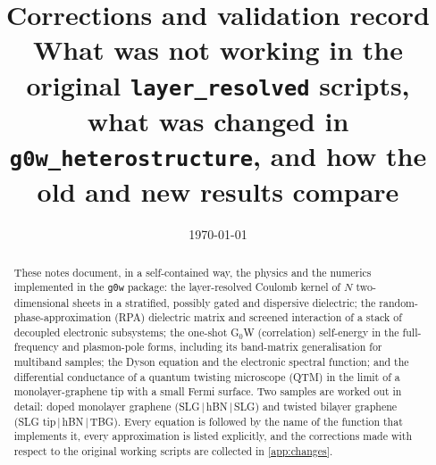 \documentclass[11pt,a4paper]{article}
\title{\textbf{Corrections and validation record}\\[4pt]
\large What was not working in the original \texttt{layer\_resolved} scripts, what was changed in
\texttt{g0w\_heterostructure}, and how the old and new results compare}
\author{}
\date{\today}
\theoremstyle{remark}
\begin{document}
\maketitle

\begin{abstract}
These notes document, in a self-contained way, the physics and the numerics implemented in the
\texttt{g0w} package: the layer-resolved Coulomb kernel of $N$ two-dimensional sheets in a stratified,
possibly gated and dispersive dielectric; the random-phase-approximation (RPA) dielectric matrix and
screened interaction of a stack of decoupled electronic subsystems; the one-shot G$_0$W
(correlation) self-energy in the full-frequency and plasmon-pole forms, including its band-matrix
generalisation for multiband samples; the Dyson equation and the electronic spectral function; and the
differential conductance of a quantum twisting microscope (QTM) in the limit of a monolayer-graphene tip
with a small Fermi surface. Two samples are worked out in detail: doped monolayer graphene
(SLG\,$|$\,hBN\,$|$\,SLG) and twisted bilayer graphene (SLG tip\,$|$\,hBN\,$|$\,TBG). Every equation is
followed by the name of the function that implements it, every approximation is listed explicitly, and
the corrections made with respect to the original working scripts are collected in \cref{app:changes}.
\end{abstract}

\begin{center}
\end{center}

\tableofcontents
\newpage










\appendix

\end{document}
